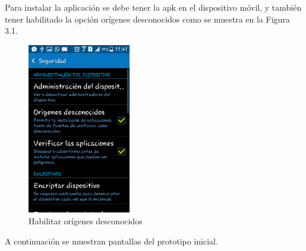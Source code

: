 Para instalar la aplicación se debe tener la apk en el dispositivo móvil, y también tener habilitado la opción orígenes desconocidos como se muestra en la Figura 3.1.
\begin{figure}[h!]
  \begin{center}	\includegraphics[width=0.4\textwidth]{imagenes/origenesdes}
  \caption{Habilitar orígenes desconocidos}
  \end{center}
\end{figure}
A continuación se muestran pantallas del prototipo inicial.
